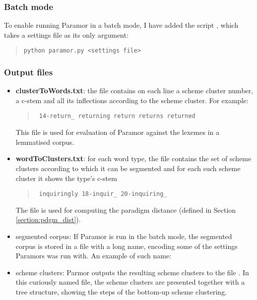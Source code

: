 \subsubsection{Batch mode}

To enable running Paramor in a batch mode, I have added the script , which takes a settings file as its only argument:

\begin{quote}
\tt python paramor.py <settings file>
\end{quote}

\subsubsection{Output files}\label{section:paramor_outfiles}
\begin{itemize}
\item \textbf{clusterToWords.txt}: the file contains on each line a scheme cluster number, a c-stem and all its inflections according to the scheme cluster. For example:
\begin{quote}\tt
14-return\_	returning	return	returns	returned
\end{quote}
This file is used for evaluation of Paramor against the lexemes in a lemmatised corpus.

\item \textbf{wordToClusters.txt}: for each word type, the file contains the set of scheme clusters according to which it can be segmented and for each such scheme cluster it shows the type's c-stem \eg
\begin{quote}\tt
inquiringly	18-inquir\_	20-inquiring\_
\end{quote}
The file is used for computing the paradigm distance (defined in Section \ref{section:pdgm_dist}).

\item segmented corpus: If Paramor is run in the batch mode, the segmented corpus is stored in
a file with a long name, encoding some of the settings Paramors was run with. An example of such name: 

\item scheme clusters: Parmor outputs the resulting scheme clusters to the file . In this curiously named file, the scheme clusters are presented together with a tree structure, showing the steps of the bottom-up scheme clustering.
\end{itemize}

